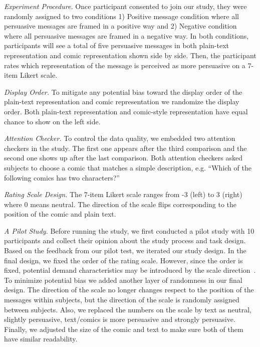 \textit{Experiment Procedure.} Once participant consented to join our study, they were randomly assigned to two conditions 1) Positive message condition where all persuasive messages are framed in a positive way and 2) Negative condition where all persuasive messages are framed in a negative way. In both conditions, participants will see a total of five persuasive messages in both plain-text representation and comic representation shown side by side. Then, the participant rates which representation of the message is perceived as more persuasive on a 7-item Likert scale.

\textit{Display Order.} To mitigate any potential bias toward the display order of the plain-text representation and comic representation we randomize the display order. Both plain-text representation and comic-style representation have equal chance to show on the left side.

\textit{Attention Checker.} To control the data quality, we embedded two attention checkers in the study. The first one appears after the third comparison and the second one shows up after the last comparison. Both attention checkers asked subjects to choose a comic that matches a simple description, e.g. ``Which of the following comics has two characters?''

\textit{Rating Scale Design.} The 7-item Likert scale ranges from -3 (left) to 3 (right) where 0 means neutral. The direction of the scale flips corresponding to the position of the comic and plain text.

\textit{A Pilot Study.} Before running the study, we first conducted a pilot study with 10 participants and collect their opinion about the study process and task design. Based on the feedback from our pilot test, we iterated our study design. In the final design, we fixed the order of the rating scale. However, since the order is fixed, potential demand characteristics may be introduced by the scale direction~\cite{orne1962social}. To minimize potential bias we added another layer of randomness in our final design. The direction of the scale no longer changes respect to the position of the messages within subjects, but the direction of the scale is randomly assigned between subjects. Also, we replaced the numbers on the scale by text as neutral, slightly persuasive, text/comics is more persuasive and strongly persuasive. Finally, we adjusted the size of the comic and text to make sure both of them have similar readability.
%

